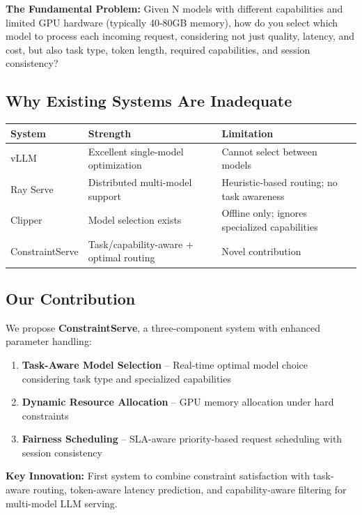 \documentclass[11pt]{article}
\begin{document}
\textbf{The Fundamental Problem:} Given N models with different capabilities and limited GPU hardware (typically 40-80GB memory), how do you select which model to process each incoming request, considering not just quality, latency, and cost, but also task type, token length, required capabilities, and session consistency?

\subsection{Why Existing Systems Are Inadequate}

\begin{table}[h]
\centering
\begin{tabular}{llll}
\toprule
\textbf{System} & \textbf{Strength} & \textbf{Limitation} \\
\midrule
vLLM & Excellent single-model optimization & Cannot select between models \\
Ray Serve & Distributed multi-model support & Heuristic-based routing; no task awareness \\
Clipper & Model selection exists & Offline only; ignores specialized capabilities \\
ConstraintServe & Task/capability-aware + optimal routing & Novel contribution \\
\bottomrule
\end{tabular}
\end{table}

\subsection{Our Contribution}

We propose \textbf{ConstraintServe}, a three-component system with enhanced parameter handling:

\begin{enumerate}
    \item \textbf{Task-Aware Model Selection} -- Real-time optimal model choice considering task type and specialized capabilities
    \item \textbf{Dynamic Resource Allocation} -- GPU memory allocation under hard constraints
    \item \textbf{Fairness Scheduling} -- SLA-aware priority-based request scheduling with session consistency
\end{enumerate}

\textbf{Key Innovation:} First system to combine constraint satisfaction with task-aware routing, token-aware latency prediction, and capability-aware filtering for multi-model LLM serving.
\end{document}
